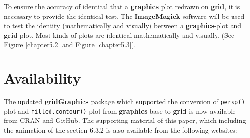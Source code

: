 \documentclass[11pt,twoside]{report}
\begin{document}
To ensure the accuracy of identical that a \textbf{graphics} plot redrawn on \textbf{grid}, it is necessary to provide the identical test. The \textbf{ImageMagick} software will be used to test the identity (mathematically and visually) between a \textbf{graphics}-plot and \textbf{grid}-plot. Most kinds of plots are identical mathematically and visually. (See Figure \ref{chapter5.2} and Figure \ref{chapter5.3}).

\section*{Availability}
The updated \textbf{gridGraphics} package which supported the conversion of \texttt{persp()} plot and \texttt{filled.contour()} plot from \textbf{graphics}-base to \textbf{grid} is now available from CRAN and GitHub. The supporting material of this paper, which including the animation of the section 6.3.2 is also available from the following websites: \\
\begin{center}
     \\
     \\
    \\
\end{center}




\nocite{hearn1997m}


\end{document}
